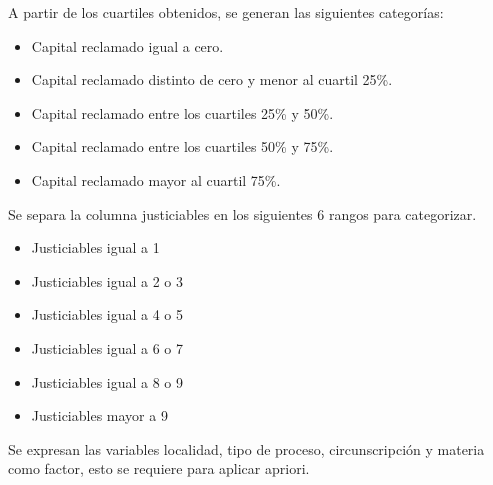 \documentclass[runningheads,a4paper]{llncs}
\newenvironment{Shaded}{}{}
\newcommand{\KeywordTok}[1]{\textcolor[rgb]{0.00,0.44,0.13}{\textbf{{#1}}}}
\newcommand{\DataTypeTok}[1]{\textcolor[rgb]{0.56,0.13,0.00}{{#1}}}
\newcommand{\StringTok}[1]{\textcolor[rgb]{0.25,0.44,0.63}{{#1}}}
\newcommand{\NormalTok}[1]{{#1}}
\newcommand{\OperatorTok}[1]{\textcolor[rgb]{0.40,0.40,0.40}{{#1}}}
\def\tightlist{} %
\begin{document}
A partir de los cuartiles obtenidos, se generan las siguientes
categorías:

\begin{itemize}
\tightlist
\item
  Capital reclamado igual a cero.
\item
  Capital reclamado distinto de cero y menor al cuartil 25\%.
\item
  Capital reclamado entre los cuartiles 25\% y 50\%.
\item
  Capital reclamado entre los cuartiles 50\% y 75\%.
\item
  Capital reclamado mayor al cuartil 75\%.
\end{itemize}

Se separa la columna justiciables en los siguientes 6 rangos para
categorizar.

\begin{itemize}
\tightlist
\item
  Justiciables igual a 1
\item
  Justiciables igual a 2 o 3
\item
  Justiciables igual a 4 o 5
\item
  Justiciables igual a 6 o 7
\item
  Justiciables igual a 8 o 9
\item
  Justiciables mayor a 9
\end{itemize}

Se expresan las variables localidad, tipo de proceso, circunscripción y
materia como factor, esto se requiere para aplicar apriori.

\begin{Shaded}
\end{Shaded}
\end{document}
